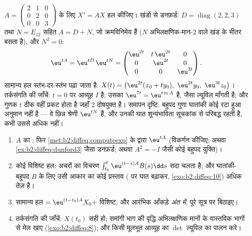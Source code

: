 \begin{example}\label{ex:b2:diffeq:dunford3}
$A = \begin{pmatrix} 2 & 1 & 0\\ 0 & 2 &
0\\ 0 & 0 & 3\end{pmatrix}$ के लिए $X' = AX$ हल कीजिए। खंडों से डनफ़र्ड: $D = \operatorname{diag}(2, 2, 3)$ तथा $N = E_{12}$ सहित $A = D + N$, जो
क्रमविनिमेय हैं ($N$ अभिलक्षणिक-मान-$2$ वाले खंड के भीतर बसता है), और $N^2 =
0$:
\[
\eu^{tA} = \eu^{tD}\,\eu^{tN}
= \begin{pmatrix}
\eu^{2t} & t\,\eu^{2t} & 0\\
0 & \eu^{2t} & 0\\
0 & 0 & \eu^{3t}
\end{pmatrix} .
\]
सामान्य हल स्तंभ-दर-स्तंभ पढ़ा जाता है: $X(t) =
\bigl(\eu^{2t}(x_0 + ty_0),\ \eu^{2t}y_0,\
\eu^{3t}z_0\bigr)$। तर्कसंगति की जाँचें: $t = 0$ पर
आव्यूह $I$ है; उसका  $\eu^{7t} =
\eu^{t\operatorname{tr}A}$ है, जैसा ल्यूविल माँगती है; और गुणक $t$
ठीक वहीं प्रकट होता है जहाँ  $2$ दोषयुक्त है। समापन दृष्टि:
बहुपद गुणा घातांकी कोई रटा हुआ अनुमान नहीं है --- वे छिन्न श्रेणी $\eu^{tN}$ हैं,
और उनकी घात शून्यंभाविता सूचकांक से परिबद्ध रहती है, कभी उससे अधिक नहीं।
\end{example}

\begin{method}[$X' = AX + B(t)$ का हल, आरंभ से अंत तक]\label{met:b2:diffeq:solvelinear}
\begin{enumerate}
  \item $A$ का ; फिर \cref{met:b2:diffeq:computeexp} के द्वारा $\eu^{tA}$ (विकर्णन कीजिए; अथवा \cref{ex:b2:diffeq:dunford3}
        जैसा डनफ़र्ड; अथवा $A^2 = -I$ जैसी कोई बहुपद युक्ति)।
  \item कोई विशिष्ट हल: अचरों का विचरण $\int_{t_0}^t\eu^{(t-s)A}B(s)\dd s$ सदा चलता है; और
        घातांकी-बहुपद $B$ के लिए उसी आकार का कोई प्रस्ताव (\omterm{pb:b2:diffeq:1}{अनुनाद} पर घात
        बढ़ाकर, \cref{exo:b2:diffeq:10}) अधिक तेज़ है।
  \item सामान्य हल $= \eu^{(t-t_0)A}X_0 +$ विशिष्ट; और आरंभिक आँकड़े \emph{अंत में}, पूरे
        सूत्र पर बिठाइए।
  \item तर्कसंगति की जाँचें: $X(t_0)$ सही हो; समांगी भाग की वृद्धि अभिलक्षणिक
        मानों के वास्तविक भागों से मेल खाए (\cref{exo:b2:diffeq:8}); और किसी मूलभूत आव्यूह
        का $\det$ ल्यूविल का पालन करे।
\end{enumerate}
\end{method}

